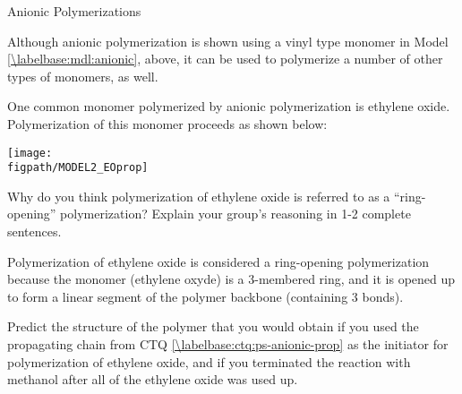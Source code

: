 \begin{activity}{Anionic Polymerizations}
\begin{ctqs}
		
\end{ctqs}


\clearpage
\begin{model}
	\label{\labelbase:mdl:anionicEO}

	Although anionic polymerization is shown using a vinyl type monomer in Model \ref{\labelbase:mdl:anionic}, above, it can be used to polymerize a number of other types of monomers, as well.
	
	One common monomer polymerized by anionic polymerization is ethylene oxide.  Polymerization of this monomer proceeds as shown below:
	
	\centerline{\texttt{[image: \\figpath/MODEL2\_EOprop]}}

\end{model}

\begin{ctqs}
	
	\question Why do you think polymerization of ethylene oxide is referred to as a ``ring-opening'' polymerization?  Explain your group's reasoning in 1-2 complete sentences.
	
		\begin{solution}[1in]
			Polymerization of ethylene oxide is considered a ring-opening polymerization because the monomer (ethylene oxyde) is a 3-membered ring, and it is opened up to form a linear segment of the polymer backbone (containing 3 bonds).
		\end{solution}
	
	\question Predict the structure of the polymer that you would obtain if you used the propagating chain from CTQ \ref{\labelbase:ctq:ps-anionic-prop} as the initiator for polymerization of ethylene oxide, and if you terminated the reaction with methanol after all of the ethylene oxide was used up.
	
		\begin{solution}[1.75in]
		\studentdisplay{}
		\end{solution}
	

\end{ctqs}
\end{activity}
